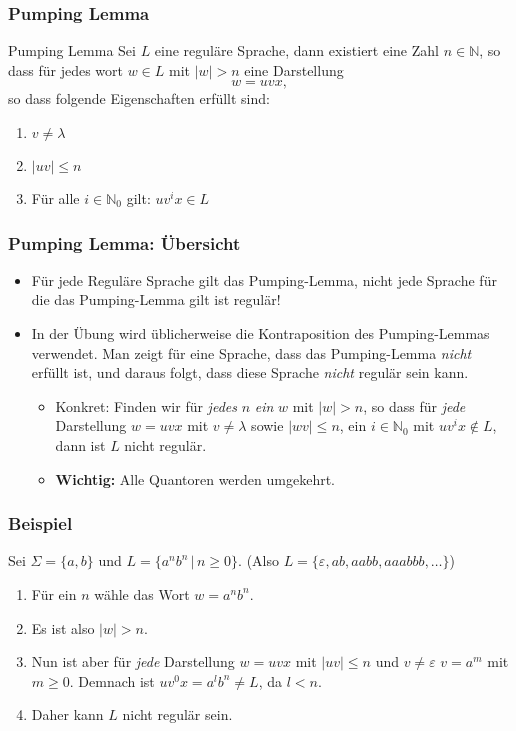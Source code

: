 \documentclass{beamer}
\begin{document}
\begin{frame}
\frametitle{Pumping Lemma}
\begin{exampleblock}{Pumping Lemma}
Sei $L$ eine reguläre Sprache, dann existiert eine Zahl $n \in \mathbb{N}$, so dass für jedes wort $w \in L$ mit $\left|w \right| > n$ eine Darstellung $$w = uvx,$$
so dass folgende Eigenschaften erfüllt sind:

\begin{enumerate}
\item $v \neq \lambda $ 
\item $\left|uv\right| \leq n$ 
\item Für alle $i \in \mathbb{N}_0$ gilt: $uv^ix \in L$
\end{enumerate}
\end{exampleblock}
\end{frame}
\begin{frame}
\frametitle{Pumping Lemma: Übersicht}
\begin{itemize}
\item Für jede Reguläre Sprache gilt das Pumping-Lemma, nicht jede Sprache für die das Pumping-Lemma gilt ist regulär!
\item In der Übung wird üblicherweise die Kontraposition des Pumping-Lemmas verwendet. Man zeigt für eine Sprache, dass das Pumping-Lemma \emph{nicht} erfüllt ist, und daraus folgt, dass diese Sprache \emph{nicht} regulär sein kann.
\begin{itemize}
\item Konkret: Finden wir für \emph{jedes} $n$ \emph{ein} $w$ mit $\left|w\right| > n$, so dass für \emph{jede} Darstellung $w = uvx$ mit $v \neq \lambda$ sowie $\left|wv\right| \leq n$, ein $i \in \mathbb{N}_0$ mit $uv^ix \notin L$, dann ist $L$ nicht regulär.
\item \textbf{Wichtig:} Alle Quantoren werden umgekehrt.
\end{itemize}
\end{itemize}
\end{frame}

\begin{frame}
\frametitle{Beispiel}
Sei $\Sigma = \{a, b\}$ und $L = \{a^nb^n\,|\,n\geq0\}$. (Also $L = \{\varepsilon,ab, aabb, aaabbb, \ldots\}$)
\begin{enumerate}
\item Für ein $n$ wähle das Wort $w = a^nb^n$.
\item Es ist also $\left|w\right| > n$.
\item Nun ist aber für \emph{jede} Darstellung $w = uvx$ mit $\left|uv\right| \leq n$ und $v \neq \varepsilon$ $v = a^m$ mit $m \geq 0$. Demnach ist $uv^0x = a^lb^n \neq L$, da $l < n$.
\item Daher kann $L$ nicht regulär sein.
\end{enumerate}

\end{frame}
\end{document}
